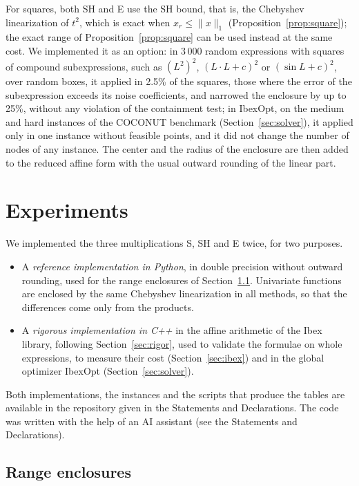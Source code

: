 \documentclass[11pt]{article}
\theoremstyle{definition}
\begin{document}
For squares, both SH and E use the SH bound, that is, the Chebyshev linearization of $t^2$, which is exact when $x_r\le\|x\|_1$ (Proposition~\ref{prop:square}); the exact range of Proposition~\ref{prop:square} can be used instead at the same cost. We implemented it as an option: in 3\,000 random expressions with squares of compound subexpressions, such as $(L^2)^2$, $(L\cdot L+c)^2$ or $(\sin L+c)^2$, over random boxes, it applied in 2.5\% of the squares, those where the error of the subexpression exceeds its noise coefficients, and narrowed the enclosure by up to 25\%, without any violation of the containment test; in IbexOpt, on the medium and hard instances of the COCONUT benchmark (Section~\ref{sec:solver}), it applied only in one instance without feasible points, and it did not change the number of nodes of any instance. The center and the radius of the enclosure are then added to the reduced affine form with the usual outward rounding of the linear part.

\section{Experiments}
\label{sec:experiments}

We implemented the three multiplications S, SH and E twice, for two purposes.
\begin{itemize}
\item A \emph{reference implementation in Python}, in double precision without outward rounding, used for the range enclosures of Section~\ref{sec:ranges}. Univariate functions are enclosed by the same Chebyshev linearization in all methods, so that the differences come only from the products.
\item A \emph{rigorous implementation in C++} in the affine arithmetic of the Ibex library, following Section~\ref{sec:rigor}, used to validate the formulae on whole expressions, to measure their cost (Section~\ref{sec:ibex}) and in the global optimizer IbexOpt (Section~\ref{sec:solver}).
\end{itemize}
Both implementations, the instances and the scripts that produce the tables are available in the repository given in the Statements and Declarations. The code was written with the help of an AI assistant (see the Statements and Declarations).

\subsection{Range enclosures}
\label{sec:ranges}
\end{document}
